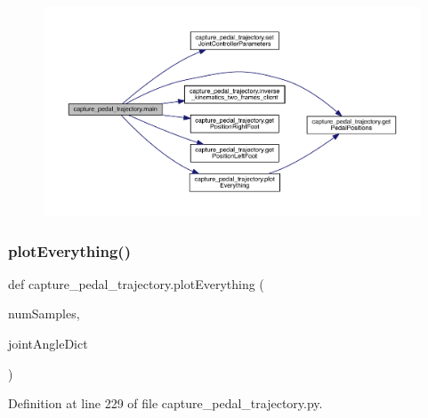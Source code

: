 \begin{figure}[H]
\begin{center}
\leavevmode
\includegraphics[width=350pt]{namespacecapture__pedal__trajectory_ae43bcee5928a71a9e44c3400a772a161_cgraph}
\end{center}
\end{figure}
\mbox{\label{namespacecapture__pedal__trajectory_a54694682225635fb5a735f159e9f059c}} 
\subsubsection{\texorpdfstring{plotEverything()}{plotEverything()}}
{\footnotesize\ttfamily def capture\+\_\+pedal\+\_\+trajectory.\+plot\+Everything (\begin{DoxyParamCaption}\item[{}]{num\+Samples,  }\item[{}]{joint\+Angle\+Dict }\end{DoxyParamCaption})}



Definition at line 229 of file capture\+\_\+pedal\+\_\+trajectory.\+py.


